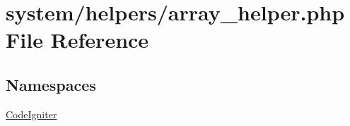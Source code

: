 \hypertarget{array__helper_8php}{}\section{system/helpers/array\+\_\+helper.php File Reference}
\label{array__helper_8php}
\subsection*{Namespaces}
\begin{DoxyCompactItemize}
\item 
 \mbox{\hyperlink{namespace_code_igniter}{Code\+Igniter}}
\end{DoxyCompactItemize}
